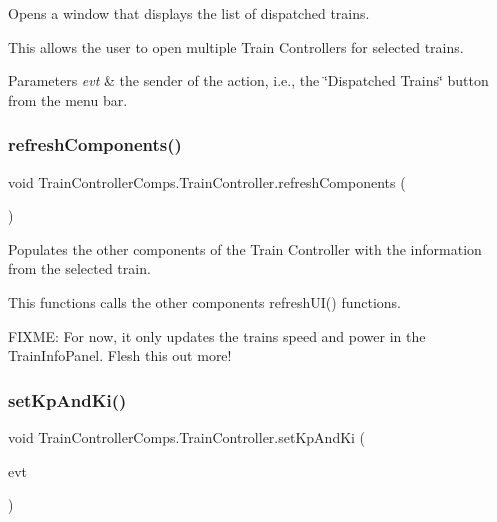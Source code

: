 Opens a window that displays the list of dispatched trains. 

This allows the user to open multiple Train Controllers for selected trains.


\begin{DoxyParams}{Parameters}
{\em evt} & the sender of the action, i.\+e., the \char`\"{}\+Dispatched Trains\char`\"{} button from the menu bar. \\
\hline
\end{DoxyParams}
\mbox{\label{classTrainControllerComps_1_1TrainController_a11a6391123f16da8974dcb65acfaf6c0}} 
\subsubsection{\texorpdfstring{refresh\+Components()}{refreshComponents()}}
{\footnotesize\ttfamily void Train\+Controller\+Comps.\+Train\+Controller.\+refresh\+Components (\begin{DoxyParamCaption}{ }\end{DoxyParamCaption})\hspace{0.3cm}{\ttfamily [private]}}



Populates the other components of the Train Controller with the information from the selected train. 

This functions calls the other component\textquotesingle{}s refresh\+U\+I() functions.

F\+I\+X\+ME\+: For now, it only updates the train\textquotesingle{}s speed and power in the Train\+Info\+Panel. Flesh this out more! \mbox{\label{classTrainControllerComps_1_1TrainController_a8b2ce51ec862cda594c72c0b9f7ef3a4}} 
\subsubsection{\texorpdfstring{set\+Kp\+And\+Ki()}{setKpAndKi()}}
{\footnotesize\ttfamily void Train\+Controller\+Comps.\+Train\+Controller.\+set\+Kp\+And\+Ki (\begin{DoxyParamCaption}\item[{java.\+awt.\+event.\+Action\+Event}]{evt }\end{DoxyParamCaption})\hspace{0.3cm}{\ttfamily [private]}}



